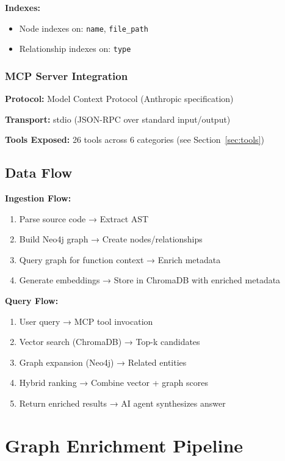 \documentclass[11pt,letterpaper]{article}
\begin{document}
\textbf{Indexes:}
\begin{itemize}
    \item Node indexes on: \texttt{name}, \texttt{file\_path}
    \item Relationship indexes on: \texttt{type}
\end{itemize}

\subsubsection{MCP Server Integration}

\textbf{Protocol:} Model Context Protocol (Anthropic specification)

\textbf{Transport:} stdio (JSON-RPC over standard input/output)

\textbf{Tools Exposed:} 26 tools across 6 categories (see Section~\ref{sec:tools})

\subsection{Data Flow}

\textbf{Ingestion Flow:}
\begin{enumerate}
    \item Parse source code → Extract AST
    \item Build Neo4j graph → Create nodes/relationships
    \item Query graph for function context → Enrich metadata
    \item Generate embeddings → Store in ChromaDB with enriched metadata
\end{enumerate}

\textbf{Query Flow:}
\begin{enumerate}
    \item User query → MCP tool invocation
    \item Vector search (ChromaDB) → Top-k candidates
    \item Graph expansion (Neo4j) → Related entities
    \item Hybrid ranking → Combine vector + graph scores
    \item Return enriched results → AI agent synthesizes answer
\end{enumerate}

\section{Graph Enrichment Pipeline}
\label{sec:ingestion}
\end{document}
